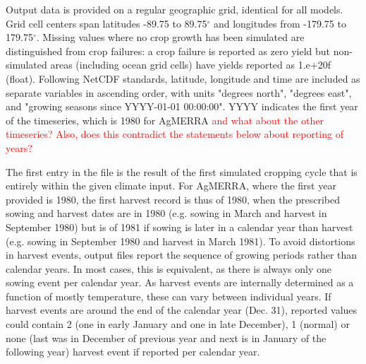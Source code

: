 \documentclass[gmd, manuscript]{copernicus} %
\begin{document}
Output data is provided on a regular geographic grid, identical for all models. 
Grid cell centers span latitudes -89.75 to 89.75$^{\circ}$ and longitudes from -179.75 to 179.75$^{\circ}$. 
Missing values  where no crop growth has been simulated are distinguished from crop failures: a crop failure is reported as zero yield but non-simulated areas (including ocean grid cells) have yields reported as 1.e+20f (float). 
Following NetCDF standards, latitude, longitude and time are included as separate variables in ascending order, with
units "degrees north", "degrees east", and "growing seasons since YYYY-01-01 00:00:00". YYYY indicates the first year of the timeseries, which is 1980 for AgMERRA \textcolor{red}{and what about the other timeseries? Also, does this contradict the statements below about reporting of years?} 

The first entry in the file is the result of the first simulated cropping cycle that is entirely within the given climate input. 
For AgMERRA, where the first year provided is 1980, the first harvest record is thus of 1980, when the prescribed sowing and harvest dates are in 1980 (e.g. sowing in March and harvest in September 1980) but is of 1981 if sowing is later in a calendar year than harvest (e.g. sowing in September 1980 and harvest in March 1981). 
To avoid distortions in harvest events, output files report the sequence of growing periods rather than calendar years. 
In most cases, this is equivalent, as there is always only one sowing event per calendar year.
As harvest events are internally determined as a function of mostly temperature, these can vary between individual years. 
If harvest events are around the end of the calendar year (Dec. 31), reported values could contain 2 (one in early January and one in late December), 1 (normal) or none (last was in December of previous year and next is in January of the following year) harvest event if reported per calendar year.
\end{document}
